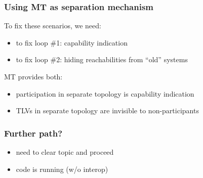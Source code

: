 \documentclass[12pt]{beamer}
\begin{document}
\begin{frame}
  \frametitle{Using MT as separation mechanism}
  To fix these scenarios, we need:
  \begin{itemize}
    \item to fix loop \#1: capability indication
    \item to fix loop \#2: hiding reachabilities from ``old'' systems
  \end{itemize}
  \vspace{5mm}
  MT provides both:
  \begin{itemize}
    \item participation in separate topology is capability indication
    \item TLVs in separate topology are invisible to non-participants
  \end{itemize}
\end{frame}

\begin{frame}
  \frametitle{Further path?}
  \begin{itemize}
    \item need to clear topic and proceed
    \item code is running (w/o interop)
  \end{itemize}
\end{frame}
\end{document}
